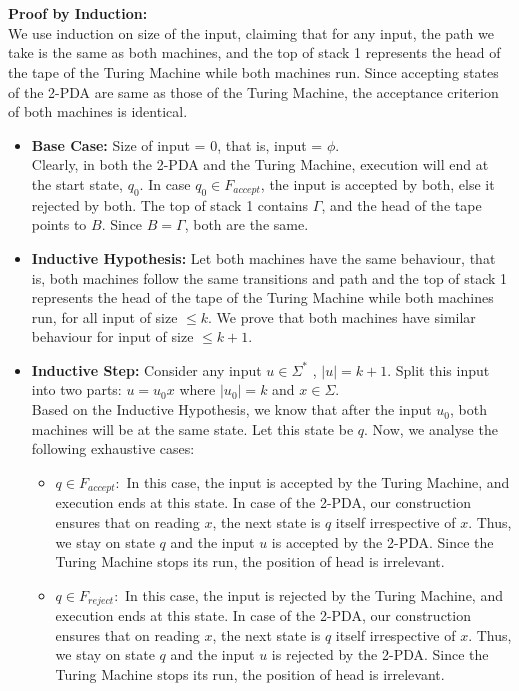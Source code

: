 \documentclass[12pt,a4paper]{article}
\begin{document}
\\
\\ \textbf{Proof by Induction:}
\\We use induction on size of the input, claiming that for any input, the path we take is the same as both machines, and the top of stack 1 represents the head of the tape of the Turing Machine while both machines run. Since accepting states of the 2-PDA are same as those of the Turing Machine, the acceptance criterion of both machines is identical.
\begin{itemize}
    \item \textbf{Base Case:} Size of input = $0$, that is, input = $\phi$.
    \\Clearly, in both the 2-PDA and the Turing Machine, execution will end at the start state, $q_0$. In case $q_0 \in F_{accept}$, the input is accepted by both, else it rejected by both. The top of stack 1 contains $\Gamma$, and the head of the tape points to $B$. Since $B = \Gamma$, both are the same.
    \item \textbf{Inductive Hypothesis:} Let both machines have the same behaviour, that is, both machines follow the same transitions and path and the top of stack 1 represents the head of the tape of the Turing Machine while both machines run, for all input of size $\leq k$. We prove that both machines have similar behaviour for input of size $\leq k + 1$.
    \item \textbf{Inductive Step:} Consider any input $u \in \Sigma^*$ , $\vert u \vert = k + 1$. Split this input into two parts: $u = u_0x$ where $\vert u_0 \vert = k$ and $x \in \Sigma$.
    \\Based on the Inductive Hypothesis, we know that after the input $u_0$, both machines will be at the same state. Let this state be $q$. Now, we analyse the following exhaustive cases:
    \begin{itemize}
        \item $q \in F_{accept}: $ In this case, the input is accepted by the Turing Machine, and execution ends at this state. In case of the 2-PDA, our construction ensures that on reading $x$, the next state is $q$ itself irrespective of $x$. Thus, we stay on state $q$ and the input $u$ is accepted by the 2-PDA. Since the Turing Machine stops its run, the position of head is irrelevant.
        \item $q \in F_{reject}: $ In this case, the input is rejected by the Turing Machine, and execution ends at this state. In case of the 2-PDA, our construction ensures that on reading $x$, the next state is $q$ itself irrespective of $x$. Thus, we stay on state $q$ and the input $u$ is rejected by the 2-PDA. Since the Turing Machine stops its run, the position of head is irrelevant.

\end{itemize}
\end{itemize}
\end{document}
